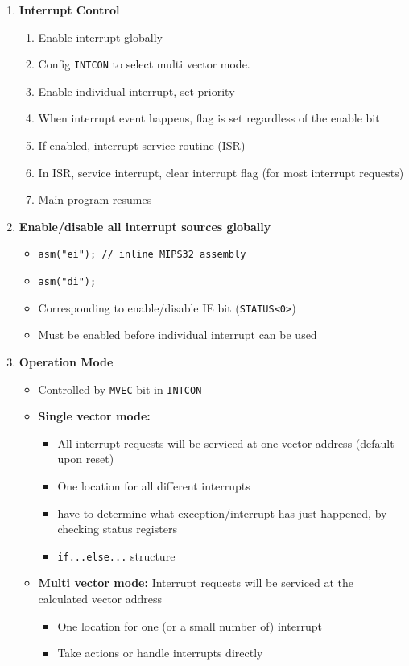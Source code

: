 \documentclass[a4paper]{article}
\begin{document}
\begin{enumerate}[label = \arabic*.]
    \item \textbf{Interrupt Control}
      \begin{enumerate}[label = \arabic*.]
        \item Enable interrupt globally
        \item Config \verb|INTCON| to select multi vector mode.
        \item Enable individual interrupt, set priority
        \item When interrupt event happens, flag is set regardless of the enable bit
        \item If enabled, interrupt service routine (ISR)
        \item In ISR, service interrupt, clear interrupt flag (for most interrupt requests)
        \item Main program resumes
      \end{enumerate}

    \item \textbf{Enable/disable all interrupt sources globally}
      \begin{itemize}[leftmargin = 1cm]
        \item \verb|asm("ei"); // inline MIPS32 assembly|
        \item \verb|asm("di");|
        \item Corresponding to enable/disable IE bit (\verb|STATUS<0>|)
        \item Must be enabled before individual interrupt can be used
      \end{itemize}

    \item \textbf{Operation Mode}
      \begin{itemize}[leftmargin = 1cm]
        \item Controlled by \verb|MVEC| bit in \verb|INTCON|
        \item \textbf{Single vector mode:}
          \begin{itemize}[leftmargin = 1cm]
            \item All interrupt requests will be serviced at one vector address (default upon reset)
            \item One location for all different interrupts
            \item have to determine what exception/interrupt has just happened, by checking status registers
            \item \verb|if...else...| structure
          \end{itemize}
        \item \textbf{Multi vector mode:} Interrupt requests will be serviced at the calculated vector address
          \begin{itemize}[leftmargin = 1cm]
            \item One location for one (or a small number of) interrupt
            \item Take actions or handle interrupts directly
          \end{itemize}
      \end{itemize}


\end{enumerate}
\end{document}
